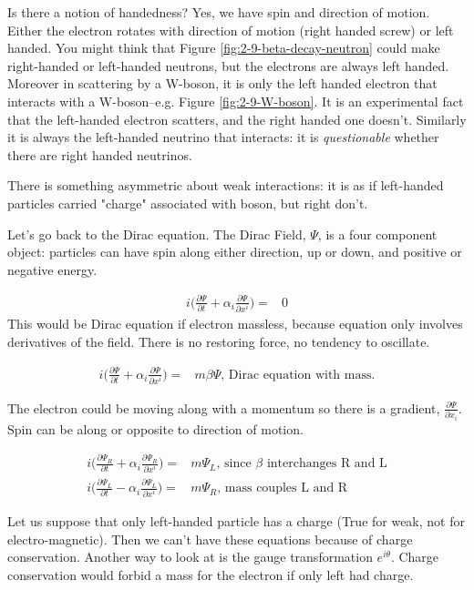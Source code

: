 \documentclass[]{article}
\begin{document}
Is there a notion of handedness? Yes, we have spin and direction of motion. Either the electron rotates with direction of motion (right handed screw) or left handed. You might think that Figure \ref{fig:2-9-beta-decay-neutron} could make right-handed or left-handed neutrons, but the electrons are always left handed. Moreover in scattering by a W-boson, it is only the left handed electron that interacts with a W-boson--e.g. Figure \ref{fig:2-9-W-boson}. It is an experimental fact that the left-handed electron scatters, and the right handed one doesn't. Similarly it is always the left-handed neutrino that interacts: it is \emph{questionable} whether there are right handed neutrinos.

There is something asymmetric about weak interactions: it is as if left-handed particles carried "charge" associated with boson, but right don't.

Let's go back to the Dirac equation. The Dirac Field, $\Psi$, is a four component object: particles can have spin along either direction, up or down, and positive or negative energy.

\begin{align*}
	i \big(\frac{\partial \Psi}{\partial t} + \alpha_i \frac{\partial \Psi}{\partial 	x^i}\big) =&0
\end{align*}
 This would be Dirac equation if electron massless, because equation only involves derivatives of the field. There is no restoring force, no tendency to oscillate.
 
 \begin{align*}
 	i \big(\frac{\partial \Psi}{\partial t} + \alpha_i \frac{\partial \Psi}{\partial 	x^i}\big) =&m \beta \Psi \text{, Dirac equation with mass.}
 \end{align*}
 
 The electron could be moving along with a momentum so there is a gradient, $\frac{\partial \Psi}{\partial x_i}$. Spin can be along or opposite to direction of motion. 
 
 \begin{align*}
 	i \big(\frac{\partial \Psi_R}{\partial t} + \alpha_i \frac{\partial \Psi_R}{\partial 	x^i}\big) =& m \Psi_L \text{, since $\beta$ interchanges R and L}\\
 	i \big(\frac{\partial \Psi_L}{\partial t} - \alpha_i \frac{\partial \Psi_L}{\partial 	x^i}\big) =& m \Psi_R \text{, mass couples L and R}
 \end{align*}
 
 Let us suppose that only left-handed particle has a charge (True for weak, not for electro-magnetic). Then we can't have these equations because of charge conservation. Another way to look at is the gauge transformation $e^{i\theta}$. Charge conservation would forbid a mass for the electron if only left had charge.
 
\end{document}
